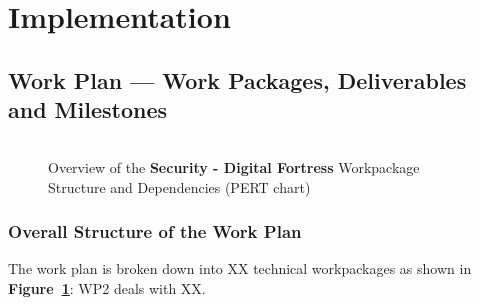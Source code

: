 \documentclass[a4paper,11pt]{article}
\newcommand{\project}[1]{\textbf{#1}\xspace}
\newcommand{\SECURITY}{\project{Security - Digital Fortress}}
\newcommand{\TheProject}{\SECURITY}
\begin{document}
\clearpage



\clearpage
\section{Implementation}

\subsection{Work Plan --- Work Packages, Deliverables and Milestones}
\label{sect:workplan}


\begin{figure}[tp]
\begin{center}
\vspace{-5mm}
\begin{tabular}{ll}
\end{tabular}
\caption{Overview of the \TheProject{} Workpackage Structure and Dependencies (PERT chart)}
\label{fig:wps}
\end{center}
\end{figure}

\subsubsection*{Overall Structure of the Work Plan}

The work plan is broken down into XX technical workpackages as shown
in \textbf{Figure~\ref{fig:wps}}: WP2 deals with XX.



\bigskip\bigskip
\addtocounter{subsubsection}{1}
\fbox{\begin{minipage}{\textwidth}\begin{center}{\Large\bf
        Work package list} %
  \end{center}
  \end{minipage}}

\bigskip\bigskip
\end{document}
